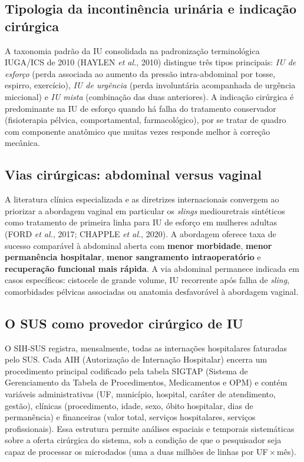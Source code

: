 \documentclass[12pt,a4paper,oneside]{article}
\begin{document}
\subsection{Tipologia da incontinência urinária e indicação cirúrgica}

A taxonomia padrão da IU \textemdash{} consolidada na padronização
terminológica IUGA/ICS de 2010 (HAYLEN \textit{et al.}, 2010)
\textemdash{} distingue três tipos principais: \textit{IU de esforço}
(perda associada ao aumento da pressão intra-abdominal por tosse,
espirro, exercício), \textit{IU de urgência} (perda involuntária
acompanhada de urgência miccional) e \textit{IU mista} (combinação
das duas anteriores). A indicação cirúrgica é predominante na IU de
esforço quando há falha do tratamento conservador (fisioterapia
pélvica, comportamental, farmacológico), por se tratar de quadro com
componente anatômico que muitas vezes responde melhor à correção
mecânica.

\subsection{Vias cirúrgicas: abdominal versus vaginal}

A literatura clínica especializada e as diretrizes internacionais
convergem ao priorizar a abordagem vaginal \textemdash{} em particular
os \textit{slings} mediouretrais sintéticos \textemdash{} como
tratamento de primeira linha para IU de esforço em mulheres adultas
(FORD \textit{et al.}, 2017; CHAPPLE \textit{et al.}, 2020). A
abordagem oferece taxa de sucesso comparável à abdominal aberta com
\textbf{menor morbidade}, \textbf{menor permanência hospitalar},
\textbf{menor sangramento intraoperatório} e \textbf{recuperação
funcional mais rápida}. A via abdominal permanece indicada em casos
específicos: cistocele de grande volume, IU recorrente após falha de
\textit{sling}, comorbidades pélvicas associadas ou anatomia
desfavorável à abordagem vaginal.

\subsection{O SUS como provedor cirúrgico de IU}

O SIH-SUS registra, mensalmente, todas as internações hospitalares
faturadas pelo SUS. Cada AIH (Autorização de Internação Hospitalar)
encerra um procedimento principal codificado pela tabela SIGTAP
(Sistema de Gerenciamento da Tabela de Procedimentos, Medicamentos e
OPM) e contém variáveis administrativas (UF, município, hospital,
caráter de atendimento, gestão), clínicas (procedimento, idade, sexo,
óbito hospitalar, dias de permanência) e financeiras (valor total,
serviços hospitalares, serviços profissionais). Essa estrutura permite
análises espaciais e temporais sistemáticas sobre a oferta cirúrgica
do sistema, sob a condição de que o pesquisador seja capaz de
processar os microdados (uma a duas milhões de linhas por UF\,$\times$\,mês).
\end{document}
